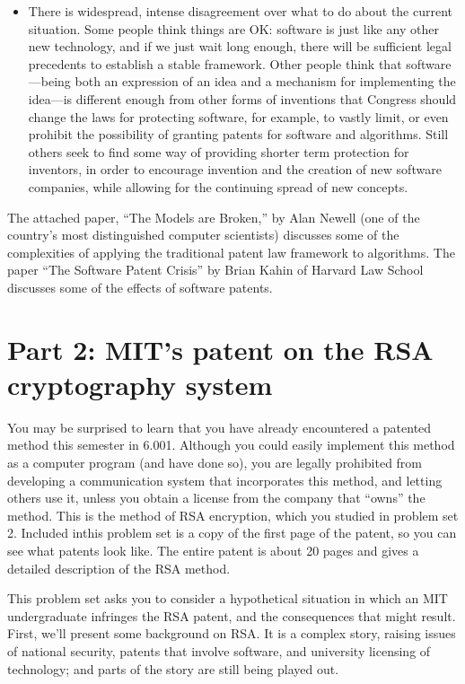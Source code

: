 \begin{itemize}
\item There is widespread, intense disagreement over what to do about the
current situation.  Some people think things are OK: software is just
like any other new technology, and if we just wait long enough, there
will be sufficient legal precedents to establish a stable framework.
Other people think that software---being both an expression of an idea
and a mechanism for implementing the idea---is different enough from
other forms of inventions that Congress should change the laws for
protecting software, for example, to vastly limit, or even prohibit
the possibility of granting patents for software and algorithms.
Still others seek to find some way of providing shorter term
protection for inventors, in order to encourage invention and the
creation of new software companies, while allowing for the continuing
spread of new concepts.

\end{itemize}

The attached paper, ``The Models are Broken,'' by Alan Newell (one of
the country's most distinguished computer scientists) discusses some
of the complexities of applying the traditional patent law framework
to algorithms.  The paper ``The Software Patent Crisis'' by Brian
Kahin of Harvard Law School discusses some of the effects of software
patents.

\section{Part 2:  MIT's patent on the RSA cryptography system}

You may be surprised to learn that you have already encountered a
patented method this semester in 6.001.  Although you could easily
implement this method as a computer program (and have done so), you
are legally prohibited from developing a communication system that
incorporates this method, and letting others use it, unless you obtain
a license from the company that ``owns'' the method.  This is the
method of RSA encryption, which you studied in problem set 2.
Included inthis problem set is a copy of the first page of the patent,
so you can see what patents look like.  The entire patent is about 20
pages and gives a detailed description of the RSA method.

This problem set asks you to consider a hypothetical situation in
which an MIT undergraduate infringes the RSA patent, and the
consequences that might result.  First, we'll present some background
on RSA.  It is a complex story, raising issues of national security,
patents that involve software, and university licensing of technology;
and parts of the story are still being played out.

